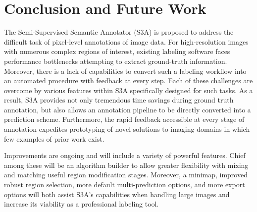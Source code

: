 \section{Conclusion and Future Work}
The Semi-Supervised Semantic Annotator (S3A) is proposed to address the difficult task of pixel-level annotations of image data. For high-resolution images with numerous complex regions of interest, existing labeling software faces performance bottlenecks attempting to extract ground-truth information. Moreover, there is a lack of capabilities to convert such a labeling workflow into an automated procedure with feedback at every step. Each of these challenges are overcome by various features within S3A specifically designed for such tasks. As a result, S3A provides not only tremendous time savings during ground truth annotation, but also allows an annotation pipeline to be directly converted into a prediction scheme. Furthermore, the rapid feedback accessible at every stage of annotation expedites prototyping of novel solutions to imaging domains in which few examples of prior work exist.

Improvements are ongoing and will include a variety of powerful features. Chief among these will be an algorithm builder to allow greater flexibility with mixing and matching useful region modification stages. Moreover, a minimap, improved robust region selection, more default multi-prediction options, and more export options will both assist S3A's capabilities when handling large images and increase its viability as a professional labeling tool.